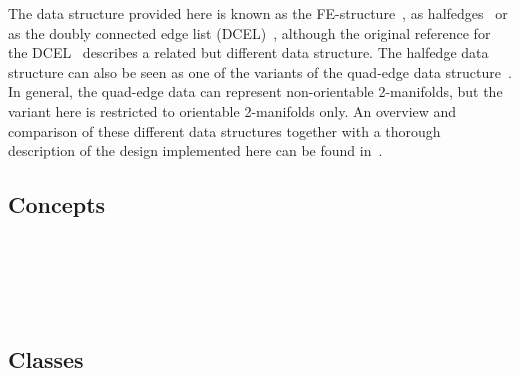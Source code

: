 The data structure provided here is known as the
FE-structure~\cite{w-ebdss-85}, as
halfedges~\cite{m-ism-88,cgal:bfh-mgedm-95} or as the doubly connected edge
list (DCEL)~\cite{bkos-cgaa-97}, although the original reference for
the DCEL~\cite{mp-fitcp-78} describes a related but different data
structure. The halfedge data structure can also be seen as one of the
variants of the quad-edge data structure~\cite{gs-pmgsc-85}. In
general, the quad-edge data can represent non-orientable 2-manifolds,
but the variant here is restricted to orientable 2-manifolds only. An
overview and comparison of these different data structures together
with a thorough description of the design implemented here can be
found in~\cite{k-ugpdd-99}.

\subsection*{Concepts}

\\ 
\\ 
\\ 
\\ 

\subsection*{Classes}

\\ 
\\

\\

\\ 
\\ 

\\ 
\\ 

\\
\\


